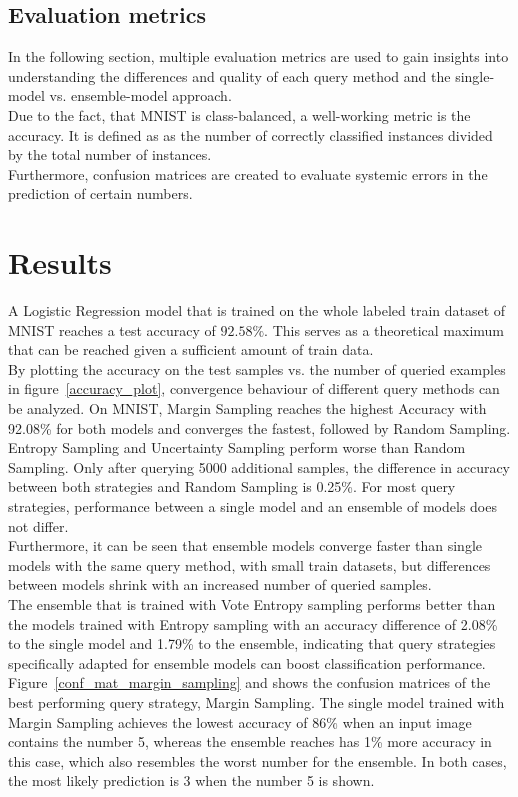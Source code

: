 \documentclass{article}
\theoremstyle{plain}
\theoremstyle{definition}
\theoremstyle{remark}
\begin{document}
\subsection{Evaluation metrics}
In the following section, multiple evaluation metrics are used to gain insights into understanding the differences and quality of each query method and the single-model vs. ensemble-model approach. \\
Due to the fact, that MNIST is class-balanced, a well-working metric is the accuracy. It is defined as as the number of correctly classified instances divided by the total number of instances. \\
Furthermore, confusion matrices are created to evaluate systemic errors in the prediction of certain numbers.  
\section{Results}\label{sec:results}
A Logistic Regression model that is trained on the whole labeled train dataset of MNIST reaches a test accuracy of $92.58\%$. This serves as a theoretical maximum that can be reached given a sufficient amount of train data. \\
By plotting the accuracy on the test samples vs. the number of queried examples in figure~\ref{accuracy_plot}, convergence behaviour of different query methods can be analyzed. On MNIST, Margin Sampling reaches the highest Accuracy with 92.08\% for both models and converges the fastest, followed by Random Sampling. Entropy Sampling and Uncertainty Sampling perform worse than Random Sampling. Only after querying 5000 additional samples, the difference in accuracy between both strategies and Random Sampling is 0.25\%. For most query strategies, performance between a single model and an ensemble of models does not differ. \\
Furthermore, it can be seen that ensemble models converge faster than single models with the same query method, with small train datasets, but differences between models shrink with an increased number of queried samples. \\
The ensemble that is trained with Vote Entropy sampling performs better than the models trained with Entropy sampling with an accuracy difference of 2.08\% to the single model and 1.79\% to the ensemble, indicating that query strategies specifically adapted for ensemble models can boost classification performance. \\
Figure~\ref{conf_mat_margin_sampling} and shows the confusion matrices of the best performing query strategy, Margin Sampling. The single model trained with Margin Sampling achieves the lowest accuracy of $86\%$ when an input image contains the number 5, whereas the ensemble reaches has 1\% more accuracy in this case, which also resembles the worst number for the ensemble. In both cases, the most likely prediction is 3 when the number 5 is shown. 
\end{document}
